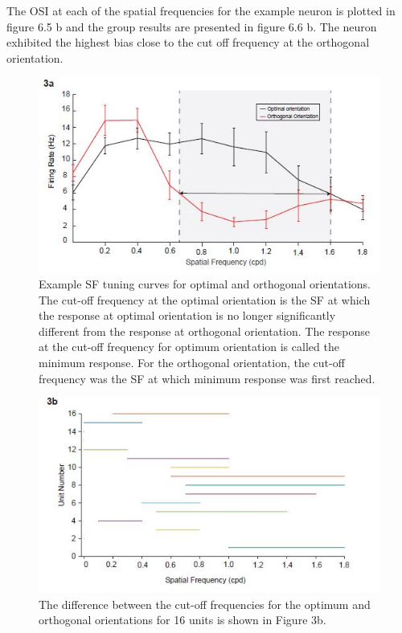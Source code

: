 	The OSI at each of the spatial frequencies for the example neuron is plotted in figure 6.5 b and the group results are presented in figure 6.6 b.
	The neuron exhibited the highest bias close to the cut off frequency at the orthogonal orientation.
	
	\begin{figure}
		\includegraphics[width=\linewidth]{SCOptOrth.jpg}
		\caption{Example SF tuning curves for optimal and orthogonal orientations. The cut-off frequency at the
			optimal orientation is the SF at which the response at optimal orientation is no longer significantly different from the response at orthogonal
			orientation. The response at the cut-off frequency for optimum orientation is called the minimum response. For the orthogonal orientation, the
			cut-off frequency was the SF at which minimum response was first reached.}
		\label{fig:fig5}			
	\end{figure}
	
	\begin{figure}
		\includegraphics[width=\linewidth]{SCSFTuning.jpg}
		\caption{ The difference between the cut-off frequencies for the optimum
			and orthogonal orientations for 16 units is shown in Figure 3b.}
		\label{fig:fig6}			
	\end{figure}
	
